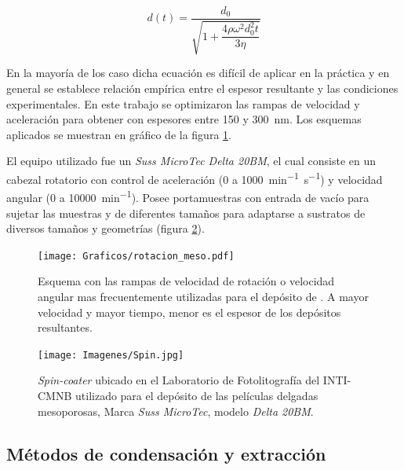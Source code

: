 			   		\begin{equation}
						d(t)=\dfrac{d_0}{\sqrt{1+\dfrac{4 \rho \omega^2 d_0^2 t}{3 \eta}}}
						\label{eq:espesor_pdm}
					\end{equation}

			En la mayoría de los caso dicha ecuación es difícil de aplicar en la práctica y en general se establece relación empírica entre el espesor resultante y las condiciones experimentales.
			En este trabajo se  optimizaron las rampas de velocidad y aceleración para obtener \pdm\space con espesores entre 150 y \SI{300}{\nm}\cite{Meyerhofer1978,Hall1998,Brinker1990}. Los esquemas aplicados se muestran en gráfico de la figura \ref{fig:rampa-spin}.			

			 El equipo utilizado fue un \textit{Suss MicroTec Delta 20BM}, el cual consiste en un cabezal rotatorio con control de aceleración (0 a  \SI{1000}{\minute^{-1}.\second^{-1}}) y velocidad angular (0 a \SI{10000}{\minute^{-1}}). Posee portamuestras con entrada de vacío para sujetar las muestras y de diferentes tamaños para adaptarse a sustratos de diversos tamaños y geometrías (figura \ref{fig:spin}).   		   

			 	\clearpage
			 	\begin{figure}[th!]
						 \begin{center}
						 \texttt{[image: Graficos/rotacion\_meso.pdf]}
						 \caption[Parámetros de depósito para las \pdm]{Esquema con las rampas de velocidad de rotación o velocidad angular mas frecuentemente utilizadas para el depósito de \pdm. A mayor velocidad y mayor tiempo, menor es el espesor de los depósitos resultantes.}
						 \label{fig:rampa-spin}
						 \end{center}
						 \end{figure}

				\begin{figure}[th!]
					  \begin{center}
					  \texttt{[image: Imagenes/Spin.jpg]}
					  \caption[Equipo para el depósito de películas delgadas, \textit{spin-coater}]{\textit{Spin-coater} ubicado en el Laboratorio de Fotolitografía del INTI-CMNB utilizado para el depósito de las películas delgadas mesoporosas, Marca \textit{Suss MicroTec}, modelo \textit{Delta 20BM}.}
					  \label{fig:spin}
					  \end{center}
					  \end{figure}
	
	\subsection{Métodos de condensación y extracción}\label{sec:cond_y_extr}

